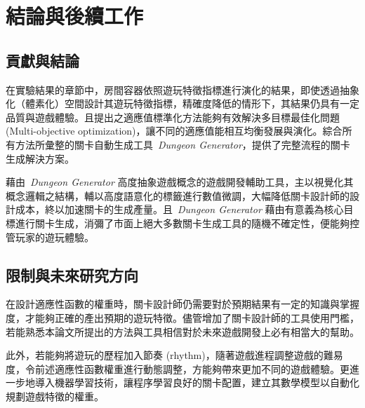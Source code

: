 \chapter{結論與後續工作}
\label{cha:conclusions}

\section{貢獻與結論}

在實驗結果的章節中，房間容器依照遊玩特徵指標進行演化的結果，即使透過抽象化（體素化）空間設計其遊玩特徵指標，精確度降低的情形下，其結果仍具有一定品質與遊戲體驗。且提出之適應值標準化方法能夠有效解決多目標最佳化問題 (Multi-objective optimization)，讓不同的適應值能相互均衡發展與演化。綜合所有方法所彙整的關卡自動生成工具~\textit{Dungeon Generator}，提供了完整流程的關卡生成解決方案。


藉由~\textit{Dungeon Generator} 高度抽象遊戲概念的遊戲開發輔助工具，主以視覺化其概念邏輯之結構，輔以高度語意化的標籤進行數值微調，大幅降低關卡設計師的設計成本，終以加速關卡的生成產量。且~\textit{Dungeon Generator} 藉由有意義為核心目標進行關卡生成，消彌了市面上絕大多數關卡生成工具的隨機不確定性，便能夠控管玩家的遊玩體驗。

\section{限制與未來研究方向} 

在設計適應性函數的權重時，關卡設計師仍需要對於預期結果有一定的知識與掌握度，才能夠正確的產出預期的遊玩特徵。儘管增加了關卡設計師的工具使用門檻，若能熟悉本論文所提出的方法與工具相信對於未來遊戲開發上必有相當大的幫助。

此外，若能夠將遊玩的歷程加入節奏 (rhythm)，隨著遊戲進程調整遊戲的難易度，令前述適應性函數權重進行動態調整，方能夠帶來更加不同的遊戲體驗。更進一步地導入機器學習技術，讓程序學習良好的關卡配置，建立其數學模型以自動化規劃遊戲特徵的權重。